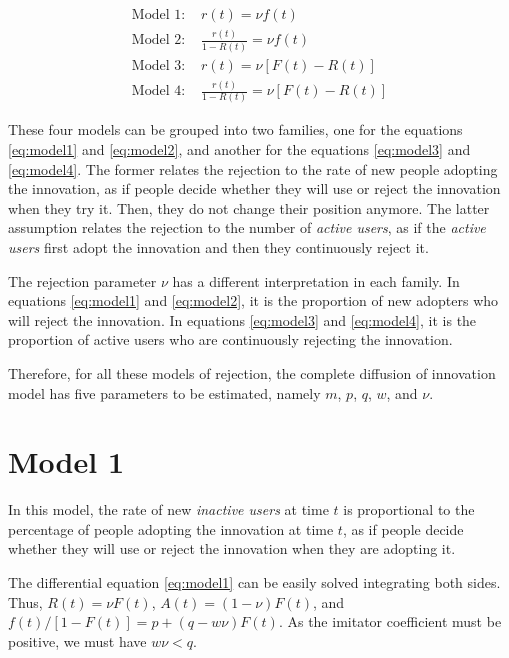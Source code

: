 \begin{align}
	\text{Model 1: }& r(t) = \nu f(t) \label{eq:model1} \\
	\text{Model 2: }& \frac{r(t)}{1-R(t)} = \nu f(t) \label{eq:model2} \\
	\text{Model 3: }& r(t) = \nu [F(t) - R(t)] \label{eq:model3} \\
	\text{Model 4: }& \frac{r(t)}{1-R(t)} = \nu [F(t) - R(t)] \label{eq:model4}
\end{align}


These four models can be grouped into two families, one for the equations \ref{eq:model1} and \ref{eq:model2}, and another for the equations \ref{eq:model3} and \ref{eq:model4}. The former relates the rejection to the rate of new people adopting the innovation, as if people decide whether they will use or reject the innovation when they try it. Then, they do not change their position anymore. The latter assumption relates the rejection to the number of \textit{active users}, as if the \textit{active users} first adopt the innovation and then they continuously reject it.

The rejection parameter $\nu$ has a different interpretation in each family. In equations \ref{eq:model1} and \ref{eq:model2}, it is the proportion of new adopters who will reject the innovation. In equations \ref{eq:model3} and \ref{eq:model4}, it is the proportion of active users who are continuously rejecting the innovation.

Therefore, for all these models of rejection, the complete diffusion of innovation model has five parameters to be estimated, namely $m$, $p$, $q$, $w$, and $\nu$.


\section{Model 1}

In this model, the rate of new \textit{inactive users} at time $t$ is proportional to the percentage of people adopting the innovation at time $t$, as if people decide whether they will use or reject the innovation when they are adopting it.

The differential equation \ref{eq:model1} can be easily solved integrating both sides. Thus, $R(t) = \nu F(t)$, $A(t) = (1 - \nu) F(t)$, and $f(t) / [1 - F(t)] = p + (q - w \nu) F(t)$. As the imitator coefficient must be positive, we must have $w \nu < q$.

